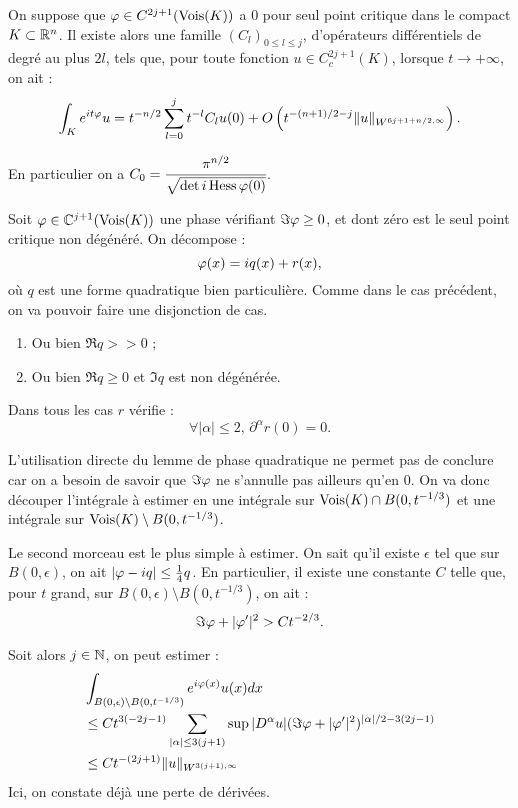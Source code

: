 \begin{prop}\label{prop:phasestat}On suppose que $\varphi \in C^{2j+1}(\operatorname{Vois}(K))$ a $0$ pour seul point critique dans le compact $K \subset \mathbb{R}^n$.
Il existe alors une famille $(C_l)_{0 \leq l \leq j}$, d'opérateurs différentiels de degré au plus $2l$, tels que, pour toute fonction $u\in C_c^{2j+1}(K)$, lorsque $t\to +\infty$, on ait :
\begin{equation*}
  \int_Ke^{it\varphi}u = t^{-n/2}\sum_{l=0}^{j}t^{-l}C_lu(0) + O\left(t^{-(n+1)/2-j}\|u\|_{W^{6j+1+n/2,\infty}}\right).
\end{equation*}

En particulier on a $C_0 = \cfrac{\pi^{n/2}}{\sqrt{\det i\operatorname{Hess}{\varphi}(0)}}$.
\end{prop}
\begin{preuve}
Soit $\varphi \in \mathbb{C}^{j+1}(\operatorname{Vois}(K))$ une phase vérifiant $\Im \varphi \geq 0$, et dont zéro est le seul point critique non dégénéré. On décompose :
\begin{equation*}
\varphi(x) = iq(x)+r(x),
\end{equation*}
\noindent où $q$ est une forme quadratique bien particulière. Comme dans le cas précédent, on va pouvoir faire une disjonction de cas.
\begin{enumerate} \item Ou bien $\Re q >>0$ ;
 \item Ou bien $\Re q \geq 0$ et $\Im q$ est non dégénérée. 
\end{enumerate}
Dans tous les cas $r$ vérifie :
\begin{equation*}
\forall |\alpha| \leq 2,\, \partial^{\alpha}r(0)=0.
\end{equation*}

L'utilisation directe du lemme de phase quadratique ne permet pas de conclure car on a besoin de savoir que $\Im \varphi$ ne s'annulle pas ailleurs qu'en 0. On va donc découper l'intégrale à estimer en une intégrale sur $\operatorname{Vois}(K) \cap B(0,t^{-1/3})$ et une intégrale sur $\operatorname{Vois}(K) \setminus B(0,t^{-1/3})$.

Le second morceau est le plus simple à estimer. On sait qu'il existe $\epsilon$ tel que sur $B(0,\epsilon)$, on ait $|\varphi-iq|\leq \frac 14 q$. En particulier, il existe une constante $C$ telle que, pour $t$ grand, sur $B(0,\epsilon)\setminus B(0,t^{-1/3})$, on ait :
\begin{equation*}
  \Im\varphi + |\varphi'|^2 > Ct^{-2/3}.
\end{equation*}

Soit alors $j\in \mathbb{N}$, on peut estimer :
\begin{align*}
&\int_{B(0,\epsilon) \setminus B(0,t^{-1/3})}e^{i\varphi(x)}u(x)dx \\
&\leq C t^{3(-2j-1)}\sum_{|\alpha| \leq 3(j+1)}\sup|D^{\alpha}u|(\Im \varphi + |\varphi'|^2)^{|\alpha|/2-3(2j-1)}\\
&\leq Ct^{-(2j+1)}\|u\|_{W^{3(j+1),\infty}}
\end{align*}
Ici, on constate déjà une perte de dérivées.


\end{preuve}
